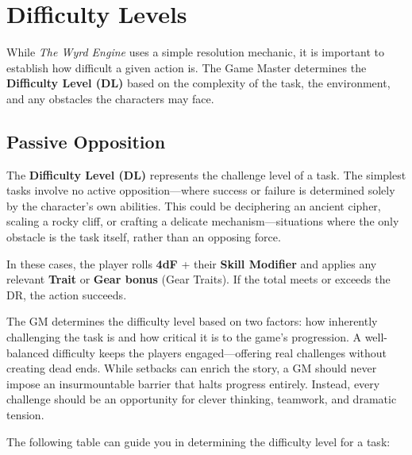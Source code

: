 \section{Difficulty Levels}
\label{core:difficulty-level}

While \emph{The Wyrd Engine} uses a simple resolution mechanic, it is important to establish how difficult a given action is. The Game Master determines the \textbf{Difficulty Level (DL)} based on the complexity of the task, the environment, and any obstacles the characters may face.

\subsection{Passive Opposition}
The \textbf{Difficulty Level (DL)} represents the challenge level of a task. The simplest tasks involve no active opposition—where success or failure is determined solely by the character’s own abilities. This could be deciphering an ancient cipher, scaling a rocky cliff, or crafting a delicate mechanism—situations where the only obstacle is the task itself, rather than an opposing force.

In these cases, the player rolls \textbf{4dF} + their \textbf{Skill Modifier} and applies any relevant \textbf{Trait} or \textbf{Gear bonus} (Gear Traits). If the total meets or exceeds the DR, the action succeeds.

The GM determines the difficulty level based on two factors: how inherently challenging the task is and how critical it is to the game’s progression. A well-balanced difficulty keeps the players engaged—offering real challenges without creating dead ends. While setbacks can enrich the story, a GM should never impose an insurmountable barrier that halts progress entirely. Instead, every challenge should be an opportunity for clever thinking, teamwork, and dramatic tension.

The following table can guide you in determining the difficulty level for a task:


